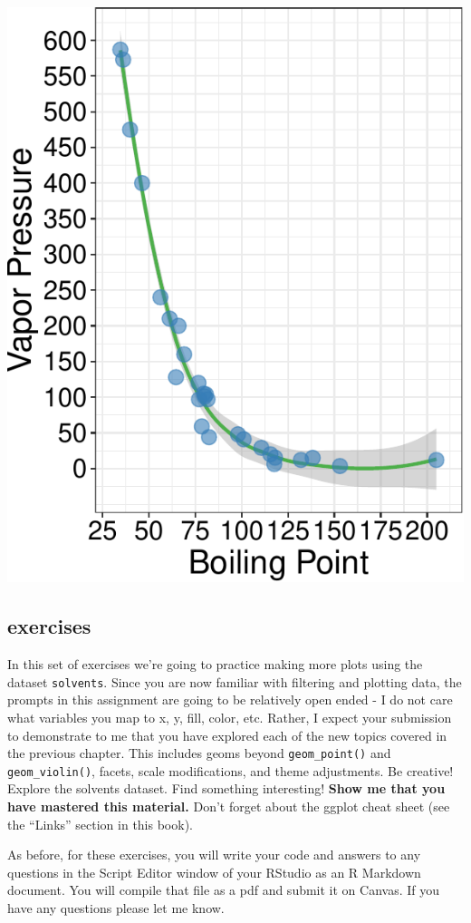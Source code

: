 \documentclass[
]{krantz}
\begin{document}
\begin{center}\includegraphics[width=0.8\linewidth]{index_files/figure-latex/unnamed-chunk-67-1} \end{center}

\hypertarget{exercises-1}{%
\subsection{exercises}\label{exercises-1}}

In this set of exercises we're going to practice making more plots using the dataset \texttt{solvents}. Since you are now familiar with filtering and plotting data, the prompts in this assignment are going to be relatively open ended - I do not care what variables you map to x, y, fill, color, etc. Rather, I expect your submission to demonstrate to me that you have explored each of the new topics covered in the previous chapter. This includes geoms beyond \texttt{geom\_point()} and \texttt{geom\_violin()}, facets, scale modifications, and theme adjustments. Be creative! Explore the solvents dataset. Find something interesting! \textbf{Show me that you have mastered this material.} Don't forget about the ggplot cheat sheet (see the ``Links'' section in this book).

As before, for these exercises, you will write your code and answers to any questions in the Script Editor window of your RStudio as an R Markdown document. You will compile that file as a pdf and submit it on Canvas. If you have any questions please let me know.
\end{document}

